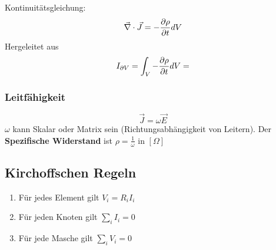 Kontinuitätsgleichung: 
\[\Vec{\nabla}\cdot\Vec{J} = - \diffp{\rho}{t} dV\]
Hergeleitet aus
\[I_{\partial V} = \int_V -\diffp{\rho}{t} dV = \]

\subsubsection{Leitfähigkeit}
\[\Vec{J} = \omega \Vec{E}\]
$\omega$ kann Skalar oder Matrix sein (Richtungsabhängigkeit von Leitern). Der \textbf{Spezifische Widerstand} ist $\rho = \frac{1}{\omega}$ in $[\Omega]$

\subsection{Kirchoffschen Regeln}
\begin{enumerate}
    \item Für jedes Element gilt $V_i = R_iI_i$
    \item Für jeden Knoten gilt $\sum_i I_i = 0$
    \item Für jede Masche gilt $\sum_i V_i = 0$
\end{enumerate}